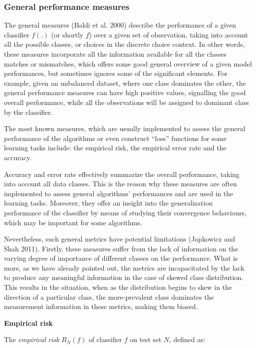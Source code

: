 \documentclass[12pt,]{article}
\begin{document}
\hypertarget{general-performance-measures}{%
\subsubsection{General performance
measures}\label{general-performance-measures}}

The general measures (Baldi et al. 2000) describe the performance of a
given classifier \(f(.)\) (or shortly \(f\)) over a given set of
observation, taking into account all the possible classes, or choices in
the discrete choice context. In other words, these measures incorporate
all the information available for all the classes matches or mismatches,
which offers some good general overview of a given model performances,
but sometimes ignores some of the significant elements. For example,
given an unbalanced dataset, where one class dominates the other, the
general performance measures can have high positive values, signalling
the good overall performance, while all the observations will be
assigned to dominant class by the classifier.

The most known measures, which are usually implemented to assess the
general performance of the algorithms or even construct ``loss''
functions for some learning tasks include: the empirical risk, the
empirical error rate and the accuracy.

Accuracy and error rate effectively summarize the overall performance,
taking into account all data classes. This is the reason why these
measures are often implemented to assess general algorithms'
performances and are used in the learning tasks. Moreover, they offer an
insight into the generalization performance of the classifier by means
of studying their convergence behaviours, which may be important for
some algorithms.

Nevertheless, such general metrics have potential limitations (Japkowicz
and Shah 2011). Firstly, these measures suffer from the lack of
information on the varying degree of importance of different classes on
the performance. What is more, as we have already pointed out, the
metrics are incapacitated by the lack to produce any meaningful
information in the case of skewed class distribution. This results in
the situation, when as the distribution begins to skew in the direction
of a particular class, the more-prevalent class dominates the
measurement information in these metrics, making them biased.

\textbf{Empirical risk}

The \emph{empirical risk} \(R_{N} (f)\) of classifier \(f\) on test set
\(N\), defined as:
\end{document}
